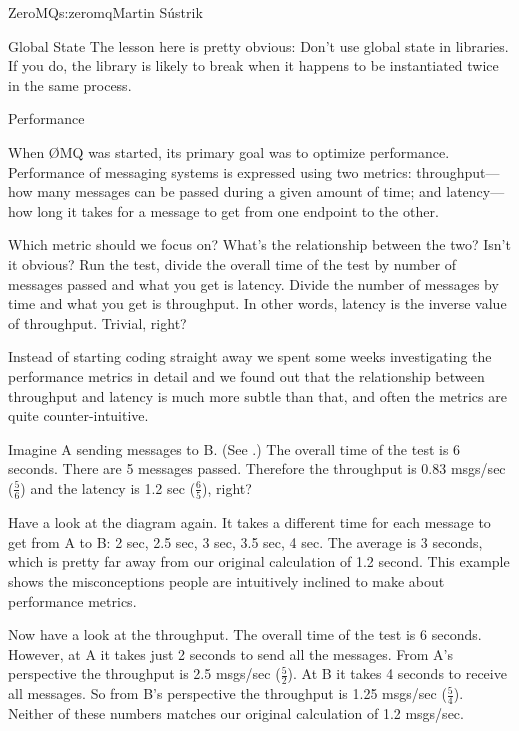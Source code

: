 \begin{aosachapter}{ZeroMQ}{s:zeromq}{Martin S\'{u}strik}
\begin{aosasect1}{Global State}
The lesson here is pretty obvious: Don't use global state in
libraries. If you do, the library is likely to break when
it happens to be instantiated twice in the same process.

\end{aosasect1}

\begin{aosasect1}{Performance}

When {\O}MQ was started, its primary goal was to optimize performance.  
Performance of messaging systems is expressed using two metrics:
throughput---how many messages can be passed during a given amount
of time; and latency---how long it takes for a message to get from
one endpoint to the other.

Which metric should we focus on? What's the relationship between the
two?
Isn't it obvious? Run the test, divide the overall time of the test by
number of messages passed and what you get is latency. Divide the
number of messages by time and what you get is throughput. In other
words, latency is the inverse value of throughput. Trivial, right?

Instead of starting coding straight away we spent some weeks 
investigating the performance metrics in detail and we found out
that the relationship between throughput and latency is much more
subtle than that, and often the metrics are quite counter-intuitive.

Imagine A sending messages to B. (See .)  The
overall time of the test is 6 seconds. There are 5 messages
passed. Therefore the throughput is 0.83 msgs/sec ($\frac{5}{6}$) and 
the latency is 1.2 sec ($\frac{6}{5}$), right?


Have a look at the diagram again. It takes a different time for each
message to get from A to B: 2 sec, 2.5 sec, 3 sec, 3.5 sec, 4 sec. The
average is 3 seconds, which is pretty far away from our original
calculation of 1.2 second.  
This example shows the misconceptions people are intuitively
inclined to make about performance metrics.

Now have a look at the throughput. The overall time of the test is 6
seconds. However, at A it takes just 2 seconds to send all the
messages. From A's perspective the throughput is 2.5 msgs/sec
($\frac{5}{2}$). At B it takes 4 seconds to receive all messages. So from B's
perspective the throughput is 1.25 msgs/sec ($\frac{5}{4}$). Neither of these
numbers matches our original calculation of 1.2 msgs/sec.


\end{aosasect1}
\end{aosachapter}
